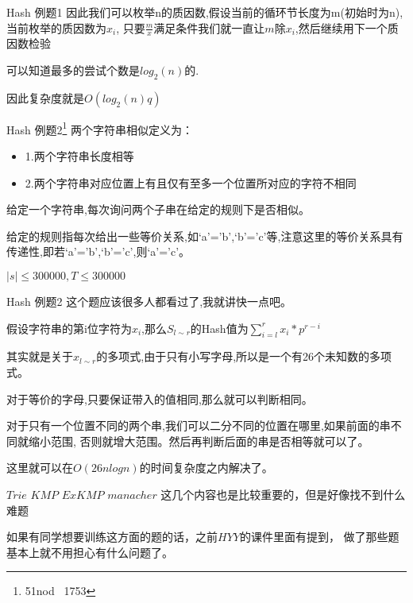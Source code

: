 \documentclass[10pt]{beamer}
\begin{document}
	\begin{frame}{Hash 例题1}
		因此我们可以枚举n的质因数,假设当前的循环节长度为m(初始时为n),当前枚举的质因数为$x_i$,
		只要$\frac{m}{x}$满足条件我们就一直让$m$除$x_i$,然后继续用下一个质因数检验\pause


		\vspace{3ex}
		可以知道最多的尝试个数是$log_2(n)$的.
		
		因此复杂度就是$O(log_2(n)q)$
	\end{frame}
	\begin{frame}{Hash 例题2\footnote{51nod $\,$ 1753}}
		两个字符串相似定义为：

		\begin{itemize}
			\item 1.两个字符串长度相等

			\vspace{2ex}

			\item 2.两个字符串对应位置上有且仅有至多一个位置所对应的字符不相同
		\end{itemize}

		\vspace{2ex}

		给定一个字符串,每次询问两个子串在给定的规则下是否相似。
		
		给定的规则指每次给出一些等价关系,如‘a'=’b',‘b'=’c'等,注意这里的等价关系具有传递性,即若‘a'=’b',‘b'=’c',则‘a'=’c'。

		\vspace{3ex}

		$|s| \leq 300000,T \leq 300000$
	\end{frame}
	\begin{frame}{Hash 例题2}
		这个题应该很多人都看过了,我就讲快一点吧。

		\vspace{2ex}

		假设字符串的第i位字符为$x_i$,那么$S_{l \sim r}$的Hash值为$\sum_{i=l}^r x_i*p^{r-i}$

		其实就是关于$x_{l \sim r}$的多项式,由于只有小写字母,所以是一个有26个未知数的多项式。

		对于等价的字母,只要保证带入的值相同,那么就可以判断相同。\pause

		对于只有一个位置不同的两个串,我们可以二分不同的位置在哪里,如果前面的串不同就缩小范围,
		否则就增大范围。然后再判断后面的串是否相等就可以了。

		这里就可以在$O(26nlogn)$的时间复杂度之内解决了。
	\end{frame}
	\begin{frame}{$Trie \,\, KMP \,\, ExKMP \,\, manacher$}
		这几个内容也是比较重要的，但是好像找不到什么难题

		\vspace{2ex}

		如果有同学想要训练这方面的题的话，之前$HYY$的课件里面有提到，
		做了那些题基本上就不用担心有什么问题了。

	\end{frame}
\end{document}
